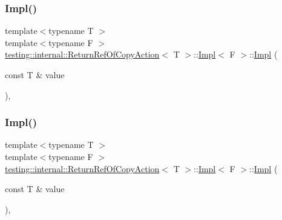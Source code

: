 \subsubsection{\texorpdfstring{Impl()}{Impl()}\hspace{0.1cm}{\footnotesize\ttfamily [2/3]}}
{\footnotesize\ttfamily template$<$typename T $>$ \\
template$<$typename F $>$ \\
\mbox{\hyperlink{classtesting_1_1internal_1_1_return_ref_of_copy_action}{testing\+::internal\+::\+Return\+Ref\+Of\+Copy\+Action}}$<$ T $>$\+::\mbox{\hyperlink{classtesting_1_1internal_1_1_return_ref_of_copy_action_1_1_impl}{Impl}}$<$ F $>$\+::\mbox{\hyperlink{classtesting_1_1internal_1_1_return_ref_of_copy_action_1_1_impl}{Impl}} (\begin{DoxyParamCaption}\item[{const T \&}]{value }\end{DoxyParamCaption})\hspace{0.3cm}{\ttfamily [inline]}, {\ttfamily [explicit]}}

\mbox{\label{classtesting_1_1internal_1_1_return_ref_of_copy_action_1_1_impl_a5019dc0a3f19a844e939a52abe63f473}} 
\subsubsection{\texorpdfstring{Impl()}{Impl()}\hspace{0.1cm}{\footnotesize\ttfamily [3/3]}}
{\footnotesize\ttfamily template$<$typename T $>$ \\
template$<$typename F $>$ \\
\mbox{\hyperlink{classtesting_1_1internal_1_1_return_ref_of_copy_action}{testing\+::internal\+::\+Return\+Ref\+Of\+Copy\+Action}}$<$ T $>$\+::\mbox{\hyperlink{classtesting_1_1internal_1_1_return_ref_of_copy_action_1_1_impl}{Impl}}$<$ F $>$\+::\mbox{\hyperlink{classtesting_1_1internal_1_1_return_ref_of_copy_action_1_1_impl}{Impl}} (\begin{DoxyParamCaption}\item[{const T \&}]{value }\end{DoxyParamCaption})\hspace{0.3cm}{\ttfamily [inline]}, {\ttfamily [explicit]}}



